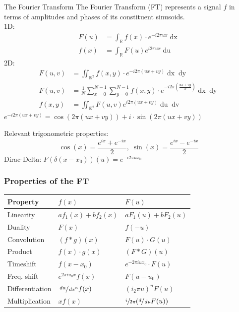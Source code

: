\documentclass[a4paper,10pt]{article}
\renewcommand*{\arraystretch}{2}
\begin{document}
\begin{mainbox}{The Fourier Transform}	
    The Fourier Transform (FT) represents a signal \( f \) in terms of amplitudes and phases of its constituent sinusoids.\\
    1D:
    \begin{align*}
	F(u) &= \int_\mathbb{R} f(x) \cdot e^{-i2\pi ux} \mathop{dx} \\
	f(x) &= \int_\mathbb{R} F(u) e^{i 2\pi ux} \mathop{du} \tag{inverse}
    \end{align*}
    2D: 
    \begin{align*}
	F(u,v) &= \iint_{\mathbb{R}^2} f(x,y) \cdot e^{-i2\pi(ux + vy)} \mathop{dx} \mathop{dy} \\
	F(u,v) &= \frac{1}{N} \sum^{N-1}_{x=0} \sum^{N-1}_{y=0} f(x,y) \cdot e^{-i2\pi (\frac{ux+vy}{N})} \mathop{dx}\mathop{dy} \\
	f(x,y) &= \iint_{\mathbb{R}^2} F(u,v) e^{i 2\pi (ux+vy)} \mathop{du}\mathop{dv} \tag{inverse}
    \end{align*} 
    \( e^{-i2\pi (ux+vy)} = \cos (2\pi (ux+vy)) + i \cdot \sin(2\pi (ux + vy)) \)
\end{mainbox}
Relevant trigonometric properties:
\[\cos(x) = \frac{e^{ix} + e^{-ix}}{2},\; \sin(x) = \frac{e^{ix}-e^{-ix}}{2} \]
Dirac-Delta: \( F(\delta(x-x_{0}))(u) = e^{-i 2\pi ux_{0}} \)

\subsubsection{Properties of the FT}
\begin{center}
    {\renewcommand{\arraystretch}{1.2}
    \begin{tabularx}{\linewidth}{Xll}
	\toprule
	Property & \( f(x) \) & \( F(u) \) \\
	\midrule
	Linearity & \( af_{1}(x) + bf_{2}(x) \) & \( aF_{1}(u) + bF_{2}(u) \) \\
	Duality & \( F(x) \) & \( f(-u) \) \\
	Convolution & \( (f*g)(x) \) & \( F(u) \cdot G(u) \) \\
	Product & \( f(x) \cdot g(x) \) & \( (F*G)(u) \) \\
	Timeshift & \( f(x -x_{0}) \) & \( e^{-2\pi i ux_{0}} \cdot F(u) \) \\
	Freq. shift & \( e^{2\pi i u_{0}x} f(x) \) & \( F(u - u_{0}) \) \\
	Differentiation & \( \sfrac{\mathop{dn}}{\mathop{dx^n}} f(x) \) & \( (i_{2}\pi u)^n F(u) \) \\
	Multiplication & \( xf(x) \) & \( \sfrac{i}{2\pi } (\sfrac{d}{\mathop{du}} F(u)) \) \\
	\bottomrule
    \end{tabularx}
    }
\end{center}
\end{document}
